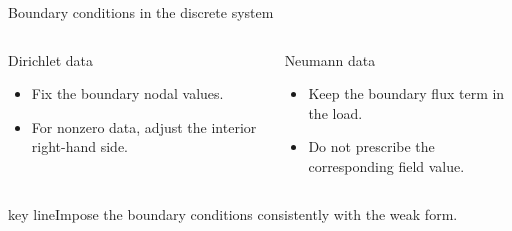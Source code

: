 \documentclass[aspectratio=169,11pt]{beamer}
\newcommand{\key}[1]{\par\vspace{4mm}\begin{beamercolorbox}[sep=2.5mm,wd=\textwidth]{key line}\normalsize #1\end{beamercolorbox}}
\begin{document}
\begin{frame}{Boundary conditions in the discrete system}
\begin{columns}[c,onlytextwidth]
\begin{block}{Dirichlet data}
\begin{itemize}
\item Fix the boundary nodal values.
\item For nonzero data, adjust the interior right-hand side.
\end{itemize}
\end{block}
\begin{exampleblock}{Neumann data}
\begin{itemize}
\item Keep the boundary flux term in the load.
\item Do not prescribe the corresponding field value.
\end{itemize}
\end{exampleblock}
\end{columns}\key{Impose the boundary conditions consistently with the weak form.}
\end{frame}
\end{document}
